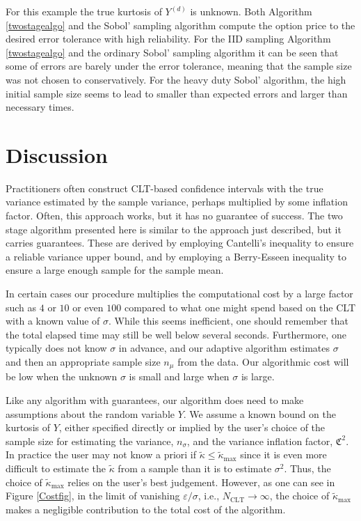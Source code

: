 \documentclass[graybox]{svmult}
\newcommand{\fudge}{\mathfrak{C}}
\newcommand{\tkappa}{\tilde{\kappa}}
\begin{document}
For this example the true kurtosis of $Y^{(d)}$ is unknown.  Both  Algorithm \ref{twostagealgo} and the  Sobol' sampling algorithm compute the option price to the desired error tolerance with high reliability.  For the IID sampling Algorithm \ref{twostagealgo} and the ordinary Sobol' sampling algorithm it can be seen that some of errors are barely under the error tolerance, meaning that the sample size was not chosen to conservatively.  For the heavy duty Sobol' algorithm, the high initial sample size seems to lead to smaller than expected errors and larger than necessary times.

\section{Discussion}

Practitioners often construct CLT-based confidence intervals with the true variance estimated by the sample variance, perhaps multiplied by some inflation factor.  Often, this approach works, but it has no guarantee of success.  The two stage algorithm presented here is similar to the approach just described, but it carries guarantees. These are derived by employing Cantelli's inequality to ensure a reliable variance upper bound, and by employing a Berry-Esseen inequality to ensure a large enough sample for the sample mean.  

In certain cases our procedure multiplies the computational cost by a large factor such as $4$ or $10$ or even $100$ compared to what one might spend based on the CLT with a known value of $\sigma$.  While this seems inefficient, one should remember that the total elapsed time may still be well below several seconds.  Furthermore, one typically does not know $\sigma$ in advance, and our adaptive algorithm estimates $\sigma$ and then an appropriate sample size $n_\mu$ from the data.  Our algorithmic cost will be low when the unknown $\sigma$ is small and large when $\sigma$ is large.

Like any algorithm with guarantees, our algorithm does need to make assumptions about the random variable $Y$.  We assume a known bound on the kurtosis of $Y$, either specified directly or implied by the user's choice of the sample size for estimating the variance, $n_\sigma$, and the variance inflation factor, $\fudge^2$.  In practice the user may not know a priori if $\tkappa \le \tkappa_{\max}$ since it is even more difficult to estimate the $\tkappa$ from a sample than it is to estimate $\sigma^2$.  Thus, the choice of $\tkappa_{\max}$ relies on the user's best judgement.  However, as one can see in Figure \ref{Costfig}, in the limit of vanishing $\varepsilon/\sigma$, i.e., $N_{\text{CLT}} \to \infty$, the choice of $\tkappa_{\max}$ makes a negligible contribution to the total cost of the algorithm.
\end{document}
